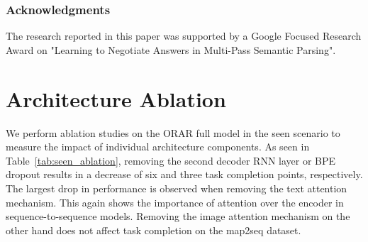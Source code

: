 \documentclass[11pt]{article}
\begin{document}
\subsubsection*{Acknowledgments}
The research reported in this paper was supported by a Google Focused Research Award on "Learning to Negotiate Answers in Multi-Pass Semantic Parsing".




\clearpage
\appendix

\section{Architecture Ablation}
We perform ablation studies on the ORAR full model in the seen scenario to measure the impact of individual architecture components. As seen in Table~\ref{tab:seen_ablation}, removing the second decoder RNN layer or BPE dropout results in a decrease of six and three task completion points, respectively. The largest drop in performance is observed when removing the text attention mechanism. This again shows the importance of attention over the encoder in sequence-to-sequence models. Removing the image attention mechanism on the other hand does not affect task completion on the map2seq dataset.
\begin{table}[]
\centering
{}
\caption{ORAR full model ablation study on the \textbf{seen} scenario of Touchdown and map2seq. Metric is task completion and ablations are not cumulative.}
\label{tab:seen_ablation}
\end{table}
 
\end{document}
